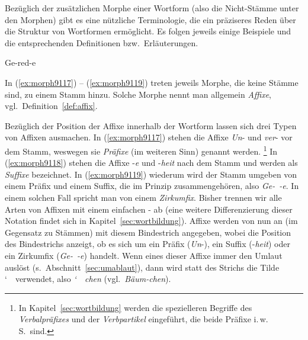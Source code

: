 Bezüglich der zusätzlichen Morphe einer Wortform (also die Nicht-Stämme unter den Morphen) gibt es eine nützliche Terminologie, die ein präziseres Reden über die Struktur von Wortformen ermöglicht.
Es folgen jeweils einige Beispiele und die entsprechenden Definitionen bzw.\ Erläuterungen.

\begin{exe}
  \ex\label{ex:morph9117}
  \begin{xlist}
  \end{xlist}
  \ex\label{ex:morph9118}
  \begin{xlist}
  \end{xlist}
  \ex\label{ex:morph9119}{Ge-red-e}
\end{exe}

In (\ref{ex:morph9117}) -- (\ref{ex:morph9119}) treten jeweils Morphe, die keine Stämme sind, zu einem Stamm hinzu.
Solche Morphe nennt man allgemein \textit{Affixe}, vgl.\ Definition~\ref{def:affix}.



Bezüglich der Position der Affixe innerhalb der Wortform lassen sich drei Typen von Affixen ausmachen.
In (\ref{ex:morph9117}) stehen die Affixe \textit{Un}- und \textit{ver}- vor dem Stamm, weswegen sie \textit{Präfixe} (im weiteren Sinn) genannt werden.%
\footnote{In Kapitel~\ref{sec:wortbildung} werden die spezielleren Begriffe des \textit{Verbalpräfixes} und der \textit{Verbpartikel} eingeführt, die beide Präfixe i.\,w.\,S.\ sind.}
In (\ref{ex:morph9118}) stehen die Affixe -\textit{e} und -\textit{heit} nach dem Stamm und werden als \textit{Suffixe} bezeichnet.
In (\ref{ex:morph9119}) wiederum wird der Stamm umgeben von einem Präfix und einem Suffix, die im Prinzip zusammengehören, also \textit{Ge-~-e}.
In einem solchen Fall spricht man von einem \textit{Zirkumfix}.
Bisher trennen wir alle Arten von Affixen mit einem einfachen - ab (eine weitere Differenzierung dieser Notation findet sich in Kapitel~\ref{sec:wortbildung}).
Affixe werden von nun an (im Gegensatz zu Stämmen) mit diesem Bindestrich angegeben, wobei die Position des Bindestrichs anzeigt, ob es sich um ein Präfix (\textit{Un}-), ein Suffix (-\textit{heit}) oder ein Zirkumfix (\textit{Ge-~-e}) handelt.
Wenn eines dieser Affixe immer den Umlaut auslöst (s.\ Abschnitt~\ref{sec:umablaut}), dann wird statt des Strichs die Tilde \char`~\ verwendet, also \zB \mbox{\textit{\char`~ chen}} (vgl.\ \textit{Bäum-chen}).

